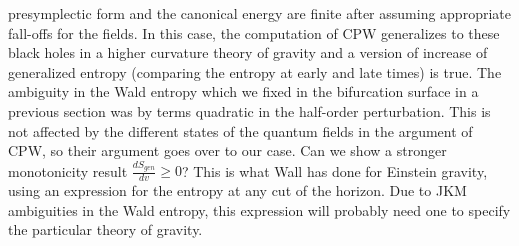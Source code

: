 \documentclass[12pt]{article}
\begin{document}
presymplectic form and the canonical energy are finite after assuming appropriate fall-offs for the fields. In this case, the computation of CPW generalizes to these black holes in a higher curvature theory of gravity and a version of increase of generalized entropy (comparing the entropy at early and late times) is true. The ambiguity in the Wald entropy which we fixed in the bifurcation surface in a previous section was by terms quadratic in the half-order perturbation. This is not affected by the different states of the quantum fields in the argument of CPW, so their argument goes over to our case. Can we show a stronger monotonicity result $\frac{dS_{gen}}{dv} \geq 0$? This is what Wall \cite{AW} has done for Einstein gravity, using an expression for the entropy at any cut of the horizon. Due to JKM ambiguities in the Wald entropy, this expression will probably need one to specify the particular theory of gravity.
\end{document}
